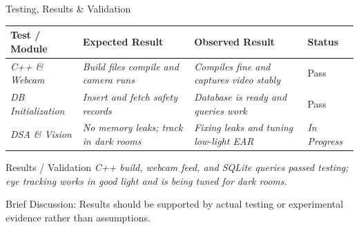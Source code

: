 \documentclass[aspectratio=169,11pt]{beamer}
\newcommand{\smallnote}[1]{%
\vspace{0.08cm}
{\scriptsize\color{GEUGrey}#1}
}
\newcommand{\placeholder}[1]{%
\textit{\color{GEUGrey}#1}
}
\begin{document}
\begin{frame}{Testing, Results \& Validation}

\scriptsize

\begin{center}

\renewcommand{\arraystretch}{1.3}

\begin{tabularx}{.96\textwidth}
{@{}p{2.1cm}X X p{1.4cm}@{}}

\toprule
Test / Module &
Expected Result &
Observed Result &
Status\\
\midrule

\placeholder{C++ \& Webcam} &
\placeholder{Build files compile and camera runs} &
\placeholder{Compiles fine and captures video stably} &
Pass\\

\placeholder{DB Initialization} &
\placeholder{Insert and fetch safety records} &
\placeholder{Database is ready and queries work} &
Pass\\

\placeholder{DSA \& Vision} &
\placeholder{No memory leaks; track in dark rooms} &
\placeholder{Fixing leaks and tuning low-light EAR} &
\placeholder{In Progress}\\

\bottomrule

\end{tabularx}

\end{center}

\vspace{3mm}

\begin{block}{Results / Validation}
\placeholder{
C++ build, webcam feed, and SQLite queries passed testing; eye tracking works in good light and is being tuned for dark rooms.
}
\end{block}

\smallnote{
Brief Discussion: Results should be supported by actual testing
or experimental evidence rather than assumptions.
}

\end{frame}
\end{document}
